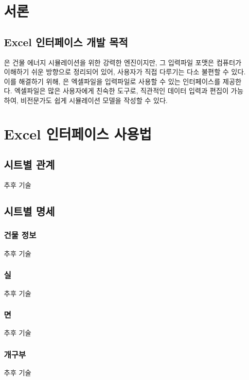 

\chapter{서론}

\section{Excel 인터페이스 개발 목적}

\simulator 은 건물 에너지 시뮬레이션을 위한 강력한 엔진이지만, 그 입력파일 포맷은 컴퓨터가 이해하기 쉬운 방향으로 정리되어 있어, 사용자가 직접 다루기는 다소 불편할 수 있다.
이를 해결하기 위해, \simulator 은 엑셀파일을 입력파일로 사용할 수 있는 인터페이스를 제공한다.
엑셀파일은 많은 사용자에게 친숙한 도구로, 직관적인 데이터 입력과 편집이 가능하여, 비전문가도 쉽게 시뮬레이션 모델을 작성할 수 있다.


\chapter{Excel 인터페이스 사용법}

\section{시트별 관계}
추후 기술

\section{시트별 명세}

\subsection{건물 정보}
추후 기술

\subsection{실}
추후 기술

\subsection{면}
추후 기술

\subsection{개구부}
추후 기술

